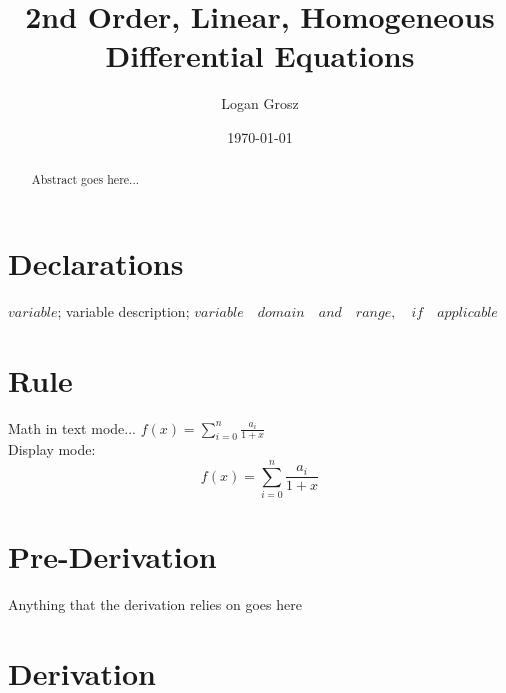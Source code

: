 \documentclass{article}
\begin{document}
	
\author{Logan Grosz}
\title{2nd Order, Linear, Homogeneous Differential Equations}
\date{\today}

\maketitle

\begin{abstract}
	Abstract goes here...
\end{abstract}

\section{Declarations}

$variable$; variable description; $variable\quad domain\quad and\quad range,\quad if\quad applicable$

\section{Rule}

Math in text mode... \( f(x) = \sum_{i=0}^{n} \frac{a_i}{1+x} \)\\

Display mode: \\
\[ f(x) = \sum_{i=0}^{n} \frac{a_i}{1+x} \]

\section{Pre-Derivation}
Anything that the derivation relies on goes here

\section{Derivation}
\end{document}
